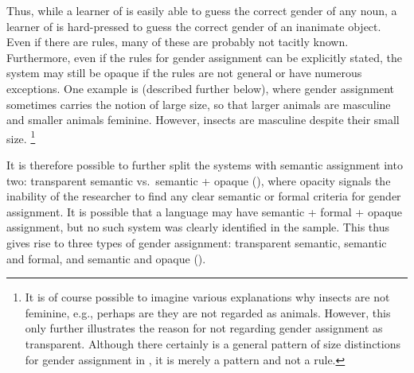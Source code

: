 \documentclass[output=collectionpaper]{langsci/langscibook}
\begin{document}
Thus, while a learner of  is easily able to guess the correct gender of any noun, a learner of  is hard-pressed to guess the correct gender of an inanimate object. Even if there are rules, many of these are probably not tacitly known. Furthermore, even if the rules for gender assignment can be explicitly stated, the system may still be opaque if the rules are not general or have numerous exceptions. One example is  (described further below), where gender assignment sometimes carries the notion of large size, so that larger animals are masculine and smaller animals feminine. However, insects are masculine despite their small size.%
\footnote{It is of course possible to imagine various explanations why insects are not feminine, e.g., perhaps are they are not regarded as animals. However, this only further illustrates the reason for not regarding  gender assignment as transparent. Although there certainly is a general pattern of size distinctions for gender assignment in , it is merely a pattern and not a rule.}

It is therefore possible to further split the systems with semantic assignment into two: transparent semantic vs.\ semantic + opaque (), where opacity signals the inability of the researcher to find any clear semantic or formal criteria for gender assignment. It is possible that a language may have semantic + formal + opaque assignment, but no such system was clearly identified in the sample. This thus gives rise to three types of gender assignment: transparent semantic, semantic and formal, and semantic and opaque ().
\end{document}

